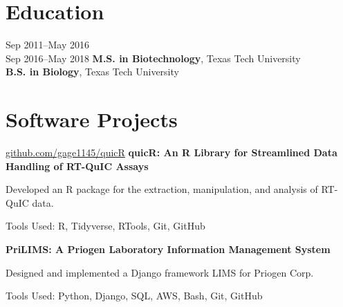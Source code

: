 \documentclass{resume}
\begin{document}
\begin{skills}
        \end{skills}
    
    \section{Education}
        \begin{twocolentry}{
            Sep 2011--May 2016\\
            Sep 2016--May 2018
        }
            \textbf{M.S. in Biotechnology}, Texas Tech University \\
            \textbf{B.S. in Biology}, Texas Tech University
        \end{twocolentry}

    \section{Software Projects}
        \begin{software}{\href{https://github.com/gage1145/quicR}{github.com/gage1145/quicR}}
            \textbf{quicR: An R Library for Streamlined Data Handling of RT-QuIC Assays}
        \end{software}
        \begin{highlights}
            \item Developed an R package for the extraction, manipulation, and analysis of RT-QuIC data.
            \item Tools Used: R, Tidyverse, RTools, Git, GitHub
        \end{highlights}

        \begin{software}{\color{primaryColor}{proprietary}}
            \textbf{PriLIMS: A Priogen Laboratory Information Management System}
        \end{software}
        \begin{highlights}
            \item Designed and implemented a Django framework LIMS for Priogen Corp.
            \item Tools Used: Python, Django, SQL, AWS, Bash, Git, GitHub
        \end{highlights}
\end{document}
